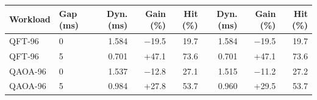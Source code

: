 \begin{tabular}{llrrrrrr}
\toprule
Workload & Gap (ms) & Dyn. (ms) & Gain (\%) & Hit (\%) & Dyn. (ms) & Gain (\%) & Hit (\%) \\
\midrule
QFT-96 & 0 & 1.584 & $-$19.5 & 19.7 & 1.584 & $-$19.5 & 19.7 \\
QFT-96 & 5 & 0.701 & +47.1 & 73.6 & 0.701 & +47.1 & 73.6 \\
QAOA-96 & 0 & 1.537 & $-$12.8 & 27.1 & 1.515 & $-$11.2 & 27.2 \\
QAOA-96 & 5 & 0.984 & +27.8 & 53.7 & 0.960 & +29.5 & 53.7 \\
\bottomrule
\end{tabular}
